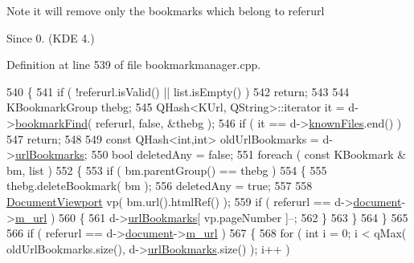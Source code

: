\begin{DoxyNote}{Note}
it will remove only the bookmarks which belong to {\ttfamily referurl} 
\end{DoxyNote}
\begin{DoxySince}{Since}
0. (K\+D\+E 4.) 
\end{DoxySince}


Definition at line 539 of file bookmarkmanager.\+cpp.


\begin{DoxyCode}
540 \{
541     \textcolor{keywordflow}{if} ( !referurl.isValid() || list.isEmpty() )
542         \textcolor{keywordflow}{return};
543 
544     KBookmarkGroup thebg;
545     QHash<KUrl, QString>::iterator it = d->\hyperlink{classBookmarkManager_1_1Private_ae01a437da3410e1459293530bae155de}{bookmarkFind}( referurl, \textcolor{keyword}{false}, &thebg );
546     \textcolor{keywordflow}{if} ( it == d->\hyperlink{classBookmarkManager_1_1Private_ad4ef503c3bf977fc59f04ea5c89b2968}{knownFiles}.end() )
547         \textcolor{keywordflow}{return};
548 
549     \textcolor{keyword}{const} QHash<int,int> oldUrlBookmarks = d->\hyperlink{classBookmarkManager_1_1Private_a1c8a7ef1c0aa4ec956125cedf1cc9c04}{urlBookmarks};
550     \textcolor{keywordtype}{bool} deletedAny = \textcolor{keyword}{false};
551     \textcolor{keywordflow}{foreach} ( \textcolor{keyword}{const} KBookmark & bm, list )
552     \{
553         \textcolor{keywordflow}{if} ( bm.parentGroup() == thebg )
554         \{
555             thebg.deleteBookmark( bm );
556             deletedAny = \textcolor{keyword}{true};
557 
558             \hyperlink{classOkular_1_1DocumentViewport}{DocumentViewport} vp( bm.url().htmlRef() );
559             \textcolor{keywordflow}{if} ( referurl == d->\hyperlink{classBookmarkManager_1_1Private_a308b94ea2abb1e9c630fc534ec403903}{document}->\hyperlink{classOkular_1_1DocumentPrivate_a1a0145bbb16d15c016000a83d0d2ab2b}{m\_url} )
560             \{
561                 d->\hyperlink{classBookmarkManager_1_1Private_a1c8a7ef1c0aa4ec956125cedf1cc9c04}{urlBookmarks}[ vp.pageNumber ]--;
562             \}
563         \}
564     \}
565 
566     \textcolor{keywordflow}{if} ( referurl == d->\hyperlink{classBookmarkManager_1_1Private_a308b94ea2abb1e9c630fc534ec403903}{document}->\hyperlink{classOkular_1_1DocumentPrivate_a1a0145bbb16d15c016000a83d0d2ab2b}{m\_url} )
567     \{
568         \textcolor{keywordflow}{for} ( \textcolor{keywordtype}{int} i = 0; i < qMax( oldUrlBookmarks.size(), d->\hyperlink{classBookmarkManager_1_1Private_a1c8a7ef1c0aa4ec956125cedf1cc9c04}{urlBookmarks}.size() ); i++ )

\end{DoxyCode}
